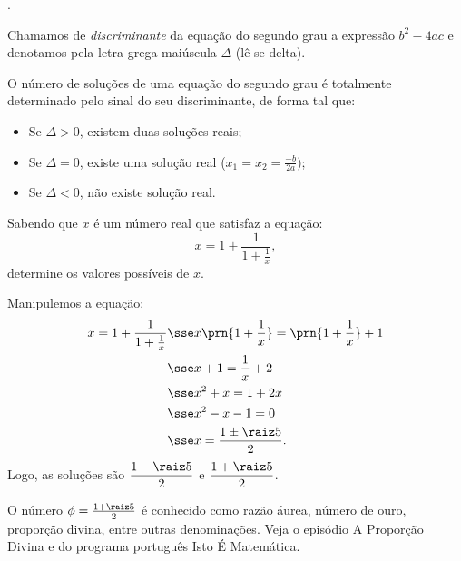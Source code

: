 \begin{onlineact}
	.
\end{onlineact}

\begin{definition}
	Chamamos de \emph{discriminante} da equação do segundo grau a expressão $b^2 - 4ac$ e denotamos pela letra grega maiúscula $\Delta$ (lê-se delta).
\end{definition}

\begin{remark}
	O número de soluções de uma equação do segundo grau é totalmente determinado pelo sinal do seu discriminante, de forma tal que:
	\begin{itemize}
		\item Se $\Delta > 0$, existem duas soluções reais;
		\item Se $\Delta = 0 $, existe uma solução real ($x_1 = x_2 = \frac{-b}{2a})$;
		\item Se $\Delta < 0$, não existe solução real.
	\end{itemize}
\end{remark}

\begin{example}
	Sabendo que $x$ é um número real que satisfaz a equação:
	\[
		x = 1 + \frac 1 {1 + \frac 1 x},
	\]
	determine os valores possíveis de $x$.
\end{example}

\begin{solution}
	Manipulemos a equação:
	\begin{align*}
		x = 1 + \dfrac 1 {1 + \frac 1 x} & \sse x \prn{1 + \dfrac 1 x } = \prn{ 1 + \dfrac 1 x }+1 \\
										 & \sse x + 1 = \dfrac 1 x + 2 \\
										 & \sse x^2 + x = 1 + 2x \\
										 & \sse x^2 - x - 1 = 0 \\
										 & \sse x = \dfrac{1 \pm\raiz 5} 2.
	\end{align*}
	Logo, as soluções são $\dfrac {1 - \raiz 5} 2$ e $\dfrac { 1 + \raiz 5 } 2$.
\end{solution}

\begin{remark}
	O número $\phi = \frac {1 + \raiz 5} 2$ é conhecido como razão áurea, número de ouro, proporção divina, entre outras denominações.
	Veja o episódio A Proporção Divina  e  do programa português Isto É Matemática.
\end{remark}

